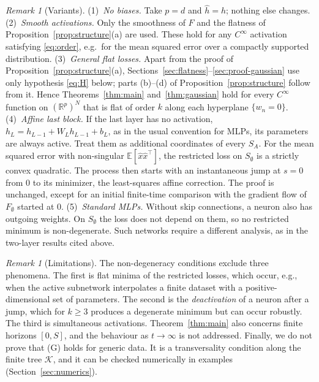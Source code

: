 \documentclass[11pt]{article}
\theoremstyle{definition}
\theoremstyle{remark}
\newtheorem{remark}[theorem]{Remark}
\numberwithin{equation}{section}
\newcommand{\R}{\mathbb{R}}
\newcommand{\E}{\mathbb{E}}
\newcommand{\cK}{\mathcal{K}}
\begin{document}
\begin{remark}[Variants]\label{rem:variants}
(1)~\emph{No biases.} Take $p=d$ and $\hat h=h$; nothing else changes.
(2)~\emph{Smooth activations.} Only the smoothness of $F$ and the flatness of Proposition~\ref{prop:structure}(a) are used. These hold for any $C^\infty$ activation satisfying \eqref{eq:order}, e.g.\ for the mean squared error over a compactly supported distribution.
(3)~\emph{General flat losses.} Apart from the proof of Proposition~\ref{prop:structure}(a), Sections~\ref{sec:flatness}--\ref{sec:proof-gaussian} use only hypothesis \eqref{eq:H} below; parts (b)--(d) of Proposition~\ref{prop:structure} follow from it. Hence Theorems~\ref{thm:main} and~\ref{thm:gaussian} hold for every $C^\infty$ function on $(\R^p)^N$ that is flat of order $k$ along each hyperplane $\{w_n=0\}$.
(4)~\emph{Affine last block.} If the last layer has no activation, $h_L=h_{L-1}+W_Lh_{L-1}+b_L$, as in the usual convention for MLPs, its parameters are always active. Treat them as additional coordinates of every $S_A$. For the mean squared error with non-singular $\E[\hat x\hat x^\top]$, the restricted loss on $S_\emptyset$ is a strictly convex quadratic. The process then starts with an instantaneous jump at $s=0$ from $0$ to its minimizer, the least-squares affine correction. The proof is unchanged, except for an initial finite-time comparison with the gradient flow of $F_\emptyset$ started at $0$.
(5)~\emph{Standard MLPs.} Without skip connections, a neuron also has outgoing weights. On $S_\emptyset$ the loss does not depend on them, so no restricted minimum is non-degenerate. Such networks require a different analysis, as in the two-layer results cited above.
\end{remark}

\begin{remark}[Limitations]\label{rem:limitations}
The non-degeneracy conditions exclude three phenomena. The first is flat minima of the restricted losses, which occur, e.g., when the active subnetwork interpolates a finite dataset with a positive-dimensional set of parameters. The second is the \emph{deactivation} of a neuron after a jump, which for $k\ge3$ produces a degenerate minimum but can occur robustly. The third is simultaneous activations. Theorem~\ref{thm:main} also concerns finite horizons $[0,S]$, and the behaviour as $t\to\infty$ is not addressed. Finally, we do not prove that (G) holds for generic data. It is a transversality condition along the finite tree $\cK$, and it can be checked numerically in examples (Section~\ref{sec:numerics}).
\end{remark}
\end{document}
